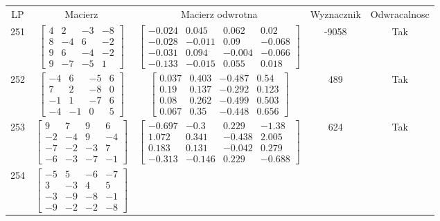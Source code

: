 \documentclass[a4paper,12pt]{article}
\begin{document}
\bgroup {} \vspace{0.2in} \begin{tabular}{c c c c c}
LP & Macierz & Macierz odwrotna & Wyznacznik & Odwracalnosc\\
251
&
$\begin{bmatrix} 4 & 2 & -3 & -8 \\ 8 & -4 & 6 & -2 \\ 9 & 6 & -4 & -2 \\ 9 & -7 & -5 & 1 \end{bmatrix}$
&
$\begin{bmatrix} -0.024 & 0.045 & 0.062 & 0.02 \\ -0.028 & -0.011 & 0.09 & -0.068 \\ -0.031 & 0.094 & -0.004 & -0.066 \\ -0.133 & -0.015 & 0.055 & 0.018 \end{bmatrix}$
&
-9058
&
Tak
\\
252
&
$\begin{bmatrix} -4 & 6 & -5 & 6 \\ 7 & 2 & -8 & 0 \\ -1 & 1 & -7 & 6 \\ -4 & -1 & 0 & 5 \end{bmatrix}$
&
$\begin{bmatrix} 0.037 & 0.403 & -0.487 & 0.54 \\ 0.19 & 0.137 & -0.292 & 0.123 \\ 0.08 & 0.262 & -0.499 & 0.503 \\ 0.067 & 0.35 & -0.448 & 0.656 \end{bmatrix}$
&
489
&
Tak
\\
253
&
$\begin{bmatrix} 9 & 7 & 9 & 6 \\ -2 & -4 & 9 & -4 \\ -7 & -2 & -3 & 7 \\ -6 & -3 & -7 & -1 \end{bmatrix}$
&
$\begin{bmatrix} -0.697 & -0.3 & 0.229 & -1.38 \\ 1.072 & 0.341 & -0.438 & 2.005 \\ 0.183 & 0.131 & -0.042 & 0.279 \\ -0.313 & -0.146 & 0.229 & -0.688 \end{bmatrix}$
&
624
&
Tak
\\
254
&
$\begin{bmatrix} -5 & 5 & -6 & -7 \\ 3 & -3 & 4 & 5 \\ -3 & -9 & -8 & -1 \\ -9 & -2 & -2 & -8 \end{bmatrix}$

\end{tabular}
\end{document}
